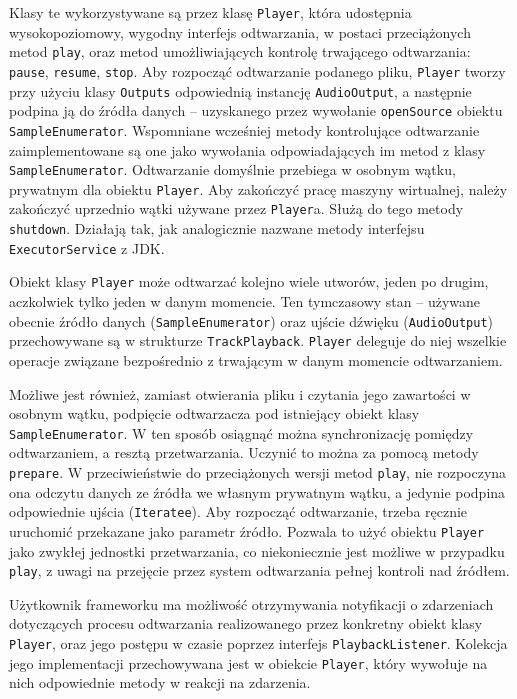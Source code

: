 Klasy te wykorzystywane są przez klasę \texttt{Player}, która udostępnia wysokopoziomowy, wygodny
interfejs odtwarzania, w postaci przeciążonych metod \texttt{play}, oraz metod umożliwiających
kontrolę trwającego odtwarzania: \texttt{pause}, \texttt{resume}, \texttt{stop}. Aby rozpocząć
odtwarzanie podanego pliku, \texttt{Player} tworzy przy użyciu klasy \texttt{Outputs} odpowiednią
instancję \texttt{AudioOutput}, a następnie podpina ją do źródła danych -- uzyskanego przez
wywołanie \texttt{openSource} obiektu \texttt{SampleEnumerator}. Wspomniane wcześniej metody
kontrolujące odtwarzanie zaimplementowane są one jako wywołania odpowiadających im metod z
klasy \texttt{SampleEnumerator}. Odtwarzanie domyślnie przebiega w osobnym wątku, prywatnym dla
obiektu \texttt{Player}. Aby zakończyć pracę maszyny wirtualnej, należy zakończyć uprzednio wątki
używane przez \texttt{Player}a. Służą do tego metody \texttt{shutdown}. Działają tak, jak
analogicznie nazwane metody interfejsu \texttt{ExecutorService} z JDK.

Obiekt klasy \texttt{Player} może odtwarzać kolejno wiele utworów, jeden po drugim, aczkolwiek tylko
jeden w danym momencie. Ten tymczasowy stan -- używane obecnie źródło danych
(\texttt{SampleEnumerator}) oraz ujście dźwięku (\texttt{AudioOutput}) przechowywane są w strukturze
\texttt{TrackPlayback}. \texttt{Player} deleguje do niej wszelkie operacje związane bezpośrednio z
trwającym w danym momencie odtwarzaniem.

Możliwe jest również, zamiast otwierania pliku i czytania jego zawartości w osobnym wątku, podpięcie
odtwarzacza pod istniejący obiekt klasy \texttt{SampleEnumerator}. W ten sposób osiągnąć można
synchronizację pomiędzy odtwarzaniem, a resztą przetwarzania. Uczynić to można za pomocą metody
\texttt{prepare}. W przeciwieństwie do przeciążonych wersji metod \texttt{play}, nie rozpoczyna ona
odczytu danych ze źródła we własnym prywatnym wątku, a jedynie podpina odpowiednie ujścia
(\texttt{Iteratee}). Aby rozpocząć odtwarzanie, trzeba ręcznie uruchomić przekazane jako parametr
źródło. Pozwala to użyć obiektu \texttt{Player} jako zwykłej jednostki przetwarzania, co
niekoniecznie jest możliwe w przypadku \texttt{play}, z uwagi na przejęcie przez system odtwarzania
pełnej kontroli nad źródłem.

Użytkownik frameworku ma możliwość otrzymywania notyfikacji o zdarzeniach dotyczących procesu
odtwarzania realizowanego przez konkretny obiekt klasy \texttt{Player}, oraz jego postępu w czasie
poprzez interfejs \texttt{PlaybackListener}. Kolekcja jego implementacji przechowywana jest w
obiekcie \texttt{Player}, który wywołuje na nich odpowiednie metody w reakcji na zdarzenia.


